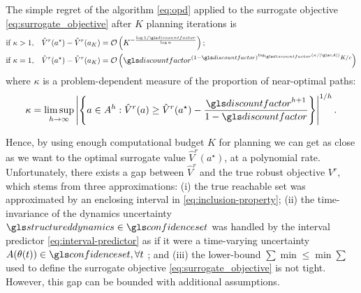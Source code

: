\begin{theorem}
	\label{theorem:opd-regret}
	\begin{leftbar}[theorembar]
	The simple regret of the \OPD algorithm \eqref{eq:opd} applied to the surrogate objective \eqref{eq:surrogate_objective} after $K$ planning iterations is
	\begin{align*}
	\text{if } \kappa>1,\quad& 
	\hat{V}^r(a^{\star}) - \hat{V}^r({a_K}) = \cO\left(K^{-\frac{\log 1/\discount}{\log \kappa}}\right);\\
	\text{if }\kappa=1,\quad&
	\hat{V}^r(a^{\star}) - \hat{V}^r({a_K}) = \cO\left(\discount^{{(1-\discount)^{\log_\discount (\kappa/|\cA|)}}K/{c}}\right)
	\end{align*}
	where $\kappa$ is a problem-dependent measure of the proportion of near-optimal paths:
	\[
	\kappa = \limsup_{h\rightarrow\infty} \left|\left\{a\in A^h: \hat{V}^r(a)\geq \hat{V}^r(a^{\star}) - \frac{\discount^{h+1}}{1-\discount}\right\}\right|^{1/h}.
	\]
	\end{leftbar}
\end{theorem}

Hence, by using enough computational budget $K$ for planning we can get as close as we want to the optimal surrogate value $\hat{V}^r(a^{\star})$, at a polynomial rate. Unfortunately, there exists a gap between $\hat{V}^r$ and the true robust objective $V^r$, which stems from three approximations: (i) the true reachable set was approximated by an enclosing interval in \eqref{eq:inclusion-property}; (ii) the time-invariance of the dynamics uncertainty $\structureddynamics\in\confidenceset$ was handled by the interval predictor \eqref{eq:interval-predictor} as if it were a time-varying uncertainty $A(\theta(t))\in\confidenceset,\forall t$ ; and (iii) the lower-bound $\sum\min\leq \min\sum$ used to define the surrogate objective \eqref{eq:surrogate_objective} is not tight. However, this gap can be bounded with additional assumptions.

